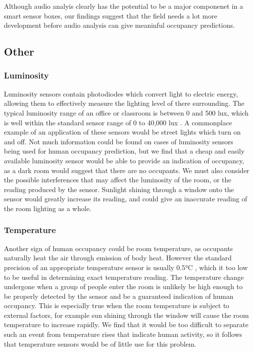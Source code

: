 \documentclass{l4proj}
\begin{document}
Although audio analyis clearly has the potential to be a major componenet in a smart sensor boxes, our findings suggest that the field needs a lot more development before audio analysis can give meaninful occupancy predictions.

\subsection{Other}
\subsubsection{Luminosity}
Luminosity sensors contain photodiodes which convert light to electric energy, allowing them to effectively measure the lighting level of there surrounding. The typical luminosity range of an office or classroom is between 0 and 500 lux, which is well within the standard sensor range of 0 to 40,000 lux \cite{c-lux}. A commonplace example of an application of these sensors would be street lights which turn on and off. Not much information could be found on cases of luminosity sensors being used for human occupancy prediction, but we find that a cheap and easily available luminosity sensor would be able to provide an indication of occupancy, as a dark room would suggest that there are no occupants. We must also consider the possible interferences that may affect the luminosity of the room, or the reading produced by the sensor. Sunlight shining through a window onto the sensor would greatly increase its reading, and could give an inaccurate reading of the room lighting as a whole.
\subsubsection{Temperature}
Another sign of human occupancy could be room temperature, as occupants naturally heat the air through emission of body heat. However the standard precision of an appropriate temperature sensor is usually 0.5°C \cite{c-temp}, which it too low to be useful in determining exact temperature reading. The temperature change undergone when a group of people enter the room is unlikely be high enough to be properly detected by the sensor and be a guaranteed indication of human occupancy. This is especially true when the room temperature is subject to external factors, for example sun shining through the window will cause the room temperature to increase rapidly. We find that it would be too difficult to separate such an event from temperature rises that indicate human activity, so it follows that temperature sensors would be of little use for this problem.
\end{document}
